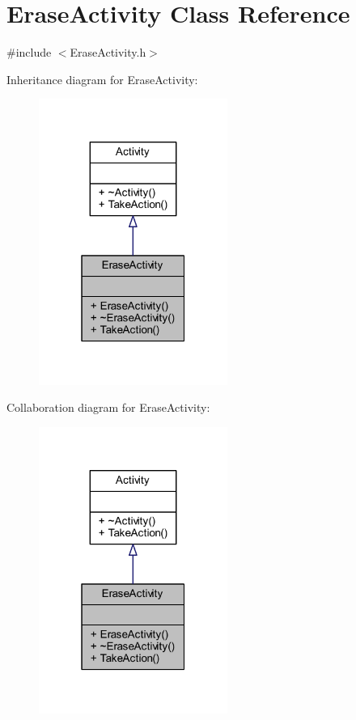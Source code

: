 \hypertarget{class_erase_activity}{}\section{Erase\+Activity Class Reference}
\label{class_erase_activity}


{\ttfamily \#include $<$Erase\+Activity.\+h$>$}



Inheritance diagram for Erase\+Activity\+:\nopagebreak
\begin{figure}[H]
\begin{center}
\leavevmode
\includegraphics[width=175pt]{class_erase_activity__inherit__graph}
\end{center}
\end{figure}


Collaboration diagram for Erase\+Activity\+:\nopagebreak
\begin{figure}[H]
\begin{center}
\leavevmode
\includegraphics[width=175pt]{class_erase_activity__coll__graph}
\end{center}
\end{figure}
